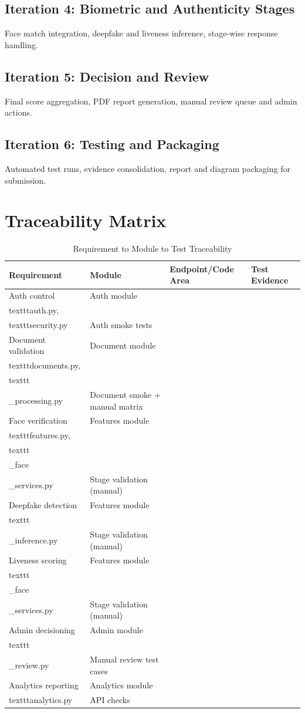 \subsection{Iteration 4: Biometric and Authenticity Stages}
Face match integration, deepfake and liveness inference, stage-wise response handling.

\subsection{Iteration 5: Decision and Review}
Final score aggregation, PDF report generation, manual review queue and admin actions.

\subsection{Iteration 6: Testing and Packaging}
Automated test runs, evidence consolidation, report and diagram packaging for submission.

\section{Traceability Matrix}
\begin{longtable}{p{2.0cm}p{4.2cm}p{4.2cm}p{3.8cm}}
\caption{Requirement to Module to Test Traceability}\\
\toprule
Requirement & Module & Endpoint/Code Area & Test Evidence \\
\midrule
Auth control & Auth module & \\texttt{auth.py}, \\texttt{security.py} & Auth smoke tests \\
Document validation & Document module & \\texttt{documents.py}, \\texttt{document\\_processing.py} & Document smoke + manual matrix \\
Face verification & Features module & \\texttt{features.py}, \\texttt{gradio\\_face\\_services.py} & Stage validation (manual) \\
Deepfake detection & Features module & \\texttt{deepfake\\_inference.py} & Stage validation (manual) \\
Liveness scoring & Features module & \\texttt{gradio\\_face\\_services.py} & Stage validation (manual) \\
Admin decisioning & Admin module & \\texttt{admin\\_review.py} & Manual review test cases \\
Analytics reporting & Analytics module & \\texttt{analytics.py} & API checks \\
\bottomrule
\end{longtable}
